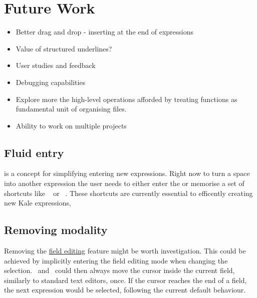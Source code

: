 \section{Future Work}

\begin{itemize}[noitemsep]
	\item Better drag and drop - inserting at the end of expressions
	\item Value of structured underlines?
	\item User studies and feedback
	\item Debugging capabilities
	\item Explore more the high-level operations afforded by treating functions as
	fundamental unit of organising files.
	\item Ability to work on multiple projects
\end{itemize}

\subsection{Fluid entry}
 is a concept for simplifying entering new expressions. Right
now to turn a space into another expression the user needs to either enter the
\hyperref[soln:space_popover]{} or memorise a set of
shortcuts like
\hyperref[cmd:make_var]{}~ or
\hyperref[cmd:make_var]{}~.
These shortcuts are currently essential to efficently creating new Kale
expressions, 

\subsection{Removing modality}
Removing the \hyperref[soln:field_editing]{field editing} feature might be
worth investigation. This could be achieved by implicitly entering the field
editing mode when changing the selection. \ak{<}~and~\ak{>} could then always
move the cursor inside the current field, similarly to standard text editors,
once. If the cursor reaches the end of a field, the next expression would be
selected, following the current default behaviour.